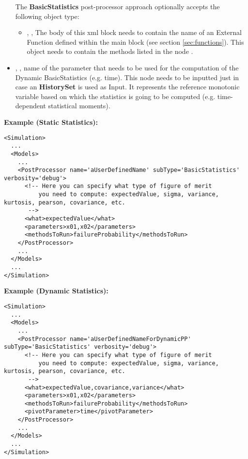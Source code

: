 \begin{itemize}
\begin{itemize}
  \end{itemize}
  The \textbf{BasicStatistics} post-processor approach optionally accepts the
  following object type:
  \begin{itemize}
    \item {}, , The body of
    this xml block needs to contain the name of an External Function defined
    within the  main block (see section \ref{sec:functions}).
    This object needs to contain the methods listed in the node
    .
  \end{itemize}
   \item {}, , name of the parameter that needs
   to be used for the computation of the Dynamic BasicStatistics (e.g. time). This node needs to
   be inputted just in case an \textbf{HistorySet} is used as Input. It represents the reference
   monotonic variable based on which the statistics is going to be computed (e.g. time-dependent
   statistical moments).
\end{itemize}
\textbf{Example (Static Statistics):}
\begin{lstlisting}[style=XML,morekeywords={name,subType,debug}]
<Simulation>
  ...
  <Models>
    ...
    <PostProcessor name='aUserDefinedName' subType='BasicStatistics' verbosity='debug'>
      <!-- Here you can specify what type of figure of merit
          you need to compute: expectedValue, sigma, variance, kurtosis, pearson, covariance, etc.
       -->
      <what>expectedValue</what>
      <parameters>x01,x02</parameters>
      <methodsToRun>failureProbability</methodsToRun>
    </PostProcessor>
    ...
  </Models>
  ...
</Simulation>
\end{lstlisting}

\textbf{Example (Dynamic Statistics):}
\begin{lstlisting}[style=XML,morekeywords={name,subType,debug}]
<Simulation>
  ...
  <Models>
    ...
    <PostProcessor name='aUserDefinedNameForDynamicPP' subType='BasicStatistics' verbosity='debug'>
      <!-- Here you can specify what type of figure of merit
          you need to compute: expectedValue, sigma, variance, kurtosis, pearson, covariance, etc.
       -->
      <what>expectedValue,covariance,variance</what>
      <parameters>x01,x02</parameters>
      <methodsToRun>failureProbability</methodsToRun>
      <pivotParameter>time</pivotParameter>
    </PostProcessor>
    ...
  </Models>
  ...
</Simulation>
\end{lstlisting}

